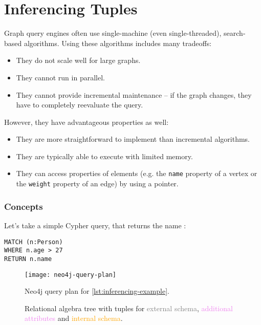 
\section{Inferencing Tuples}

Graph query engines often use single-machine (even single-threaded), search-based algorithms. Using these algorithms includes many tradeoffs:

\begin{itemize}
	\item They do not scale well for large graphs.
	\item They cannot run in parallel.
	\item They cannot provide incremental maintenance -- if the graph changes, they have to completely reevaluate the query.
\end{itemize}

However, they have advantageous properties as well:

\begin{itemize}
	\item They are more straightforward to implement than incremental algorithms.
	\item They are typically able to execute with limited memory.
	\item They can access properties of elements (e.g. the \texttt{name} property of a vertex or the \texttt{weight} property of an edge) by using a pointer.
\end{itemize}

\subsubsection{Concepts}

Let's take a simple Cypher query, that returns the name :

\begin{lstlisting}[label=lst:inferencing-example, caption=Example query]
MATCH (n:Person)
WHERE n.age > 27
RETURN n.name
\end{lstlisting}

\newcommand{\screenshotscale}{0.45}

\begin{figure}
	\centering
	\texttt{[image: neo4j-query-plan]}
	\caption{Neo4j query plan for \autoref{lst:inferencing-example}.}
	\label{fig:neo4-query-plan}
\end{figure}

\begin{figure}
	\centering
	
	\caption{Relational algebra tree with tuples for \textcolor{gray}{external schema}, \textcolor{violet}{additional attributes} and \textcolor{orange}{internal schema}.}
	\label{fig:example-inferencing}
\end{figure}

